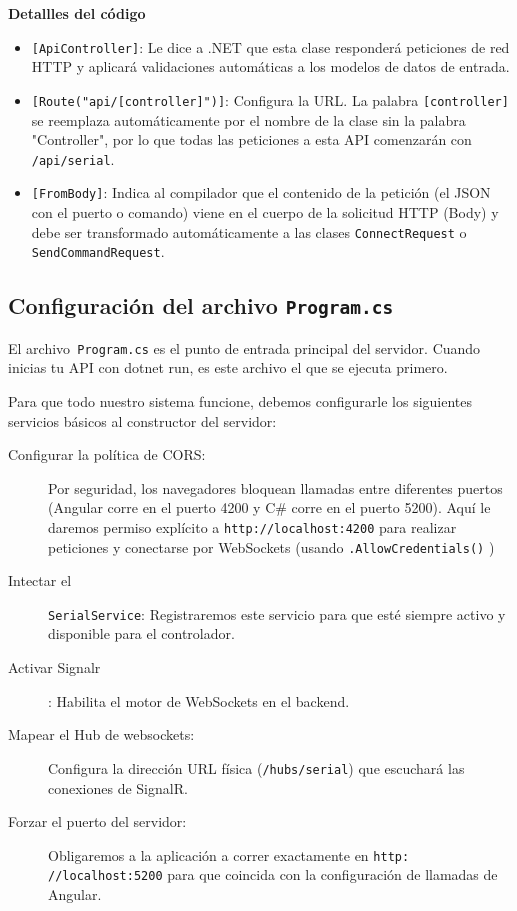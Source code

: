 \documentclass[
10pt, %
a4paper, %
oneside, %
headinclude,footinclude, %
BCOR5mm, %
]{scrartcl}
\begin{document}
\textbf{Detallles del código}\\
\begin{itemize}
	\item \texttt{[ApiController]}: Le dice a .NET que esta clase responderá peticiones de red HTTP y aplicará validaciones automáticas a los modelos de datos de entrada.
	\item \texttt{[Route("api/[controller]")]}: Configura la URL. La palabra \texttt{[controller]} se reemplaza automáticamente por el nombre de la clase sin la palabra "Controller", por lo que todas las peticiones a esta API comenzarán con \texttt{/api/serial}.
	\item \texttt{[FromBody]}: Indica al compilador que el contenido de la petición (el JSON con el puerto o comando) viene en el cuerpo de la solicitud HTTP (Body) y debe ser transformado automáticamente a las clases \texttt{ConnectRequest} o \texttt{SendCommandRequest}.
\end{itemize}

\subsection{Configuración del archivo \texttt{Program.cs}}
El archivo\texttt{ Program.cs} es el punto de entrada principal del servidor. Cuando inicias tu API con dotnet run, es este archivo el que se ejecuta primero.

Para que todo nuestro sistema funcione, debemos configurarle los siguientes servicios básicos al constructor del servidor:

\begin{description}
	\item[Configurar la política de CORS:] Por seguridad, los navegadores bloquean llamadas entre diferentes puertos (Angular corre en el puerto 4200 y C\# corre en el puerto 5200). Aquí le daremos permiso explícito a \texttt{http://localhost:4200} para realizar peticiones y conectarse por WebSockets (usando \texttt{.AllowCredentials()} )
	\item[Intectar el] \texttt{SerialService}: Registraremos este servicio para que esté siempre activo y disponible para el controlador.
	\item[Activar Signalr]: Habilita el motor de WebSockets en el backend.
	\item[Mapear el Hub de websockets:] Configura la dirección URL física (\texttt{/hubs/serial}) que escuchará las conexiones de SignalR.
	\item[Forzar el puerto del servidor:] Obligaremos a la aplicación a correr exactamente en \texttt{http:\\//localhost:5200} para que coincida con la configuración de llamadas de Angular.
\end{description}
\end{document}
